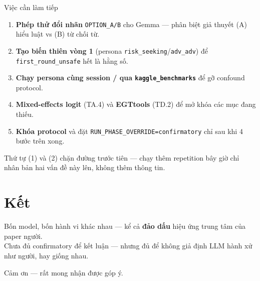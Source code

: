 \documentclass[9pt,aspectratio=169]{beamer}
\newcommand{\bad}[1]{\textcolor{RaceRed}{\textbf{#1}}}
\begin{document}
\begin{frame}{Việc cần làm tiếp}
\begin{enumerate}\small\setlength\itemsep{4pt}
\item \textbf{Phép thử đổi nhãn} \texttt{OPTION\_A/B} cho Gemma --- phân biệt giả thuyết (A) hiểu luật vs (B) từ chối từ.
\item \textbf{Tạo biến thiên vòng 1} (persona \texttt{risk\_seeking}/\texttt{adv\_adv}) để \texttt{first\_round\_unsafe} hết là hằng số.
\item \textbf{Chạy persona cùng session / qua \texttt{kaggle\_benchmarks}} để gỡ confound protocol.
\item \textbf{Mixed-effects logit} (TA.4) và \textbf{EGTtools} (TD.2) để mở khóa các mục đang thiếu.
\item \textbf{Khóa protocol} và đặt \texttt{RUN\_PHASE\_OVERRIDE=confirmatory} chỉ sau khi 4 bước trên xong.
\end{enumerate}
\vspace{0.4em}
\begin{exampleblock}{Thứ tự}
\small (1) và (2) chặn đường trước tiên --- chạy thêm repetition bây giờ chỉ nhân bản hai vấn đề này lên, không thêm thông tin.
\end{exampleblock}
\end{frame}

\section{Kết}

\begin{frame}[standout]
Bốn model, bốn hành vi khác nhau --- kể cả \bad{đảo dấu} hiệu ứng trung tâm của paper người.\\[8pt]
\small\color{RaceLime} Chưa đủ confirmatory để kết luận --- nhưng đủ để không giả định LLM hành xử như người, hay giống nhau.
\end{frame}

\begin{frame}[standout]
Cảm ơn --- rất mong nhận được góp ý.
\end{frame}

\appendix
\end{document}
